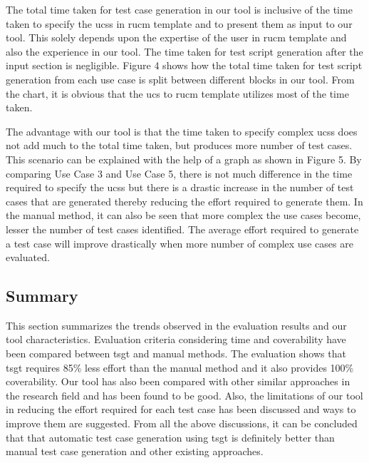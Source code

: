 The total time taken for test case generation in our tool is inclusive of the time taken to specify the \glspl{ucs} in \gls{rucm} template and to present them as input to our tool. This solely depends upon the expertise of the user in \gls{rucm} template and also the experience in our tool. The time taken for test script generation after the input section is negligible. Figure 4 shows how the total time taken for test script generation from each use case is split between different blocks in our tool. From the chart, it is obvious that the \gls{ucs} to \gls{rucm} template utilizes most of the time taken.

The advantage with our tool is that the time taken to specify complex \glspl{ucs} does not add much to the total time taken, but produces more number of test cases. This scenario can be explained with the help of a graph as shown in Figure 5. By comparing Use Case 3 and Use Case 5, there is not much difference in the time required to specify the \glspl{ucs} but there is a drastic increase in the number of test cases that are generated thereby reducing the effort required to generate them. In the manual method, it can also be seen that more complex the use cases become, lesser the number of test cases identified. The average effort required to generate a test case will improve drastically when more number of complex use cases are evaluated.

\subsection{Summary}
This section summarizes the trends observed in the evaluation results and our tool characteristics. Evaluation criteria considering time and coverability have been compared between \gls{tsgt} and manual methods. The evaluation shows that \gls{tsgt} requires 85\% less effort than the manual method and it also provides 100\% coverability. Our tool has also been compared with other similar approaches in the research field and has been found to be good. Also, the limitations of our tool in reducing the effort required for each test case has been discussed and ways to improve them are suggested. From all the above discussions, it can be concluded that that automatic test case generation using \gls{tsgt} is definitely better than manual test case generation and other existing approaches. 